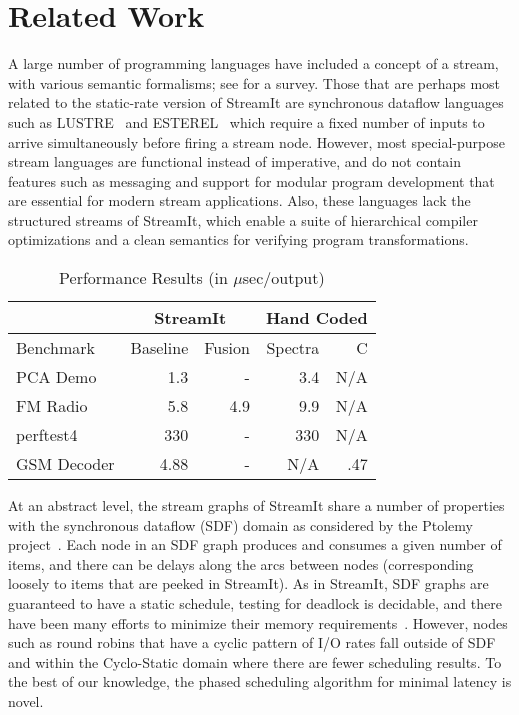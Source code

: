 \section{Related Work}
\label{sec:related}

A large number of programming languages have included a concept of a
stream, with various semantic formalisms; see \cite{survey97} for a
survey.  Those that are perhaps most related to the static-rate
version of StreamIt are synchronous dataflow languages such as
LUSTRE~\cite{lustre} and ESTEREL~\cite{esterel92} which require a
fixed number of inputs to arrive simultaneously before firing a stream
node.  However, most special-purpose stream languages are functional
instead of imperative, and do not contain features such as messaging
and support for modular program development that are essential for
modern stream applications.  Also, these languages lack the structured
streams of StreamIt, which enable a suite of hierarchical compiler
optimizations and a clean semantics for verifying program
transformations.

\begin{table}[t]
\begin{center}
\scriptsize
\begin{tabular}{|l|r|r|r|r|} \hline
& \multicolumn{2}{|c|}{StreamIt} &  \multicolumn{2}{|c|}{Hand Coded}\\
\hline 
Benchmark & Baseline & Fusion & Spectra & C \\
\hline \hline
PCA Demo & 1.3 & - & 3.4 & N/A\\
\hline
FM Radio & 5.8 & 4.9 & 9.9 & N/A\\
\hline
perftest4 & 330 & - & 330 & N/A\\
\hline
GSM Decoder & 4.88 & - & N/A & .47\\
\hline
\end{tabular}
\vspace{-6pt}
\caption{\protect\small Performance Results (in $\mu$sec/output)}
\label{tab:performance}
\vspace{-21pt}
\end{center}
\end{table}

At an abstract level, the stream graphs of StreamIt share a number of
properties with the synchronous dataflow (SDF) domain as considered by
the Ptolemy project~\cite{ptolemyoverview}.  Each node in an SDF graph
produces and consumes a given number of items, and there can be delays
along the arcs between nodes (corresponding loosely to items that are
peeked in StreamIt). As in StreamIt, SDF graphs are guaranteed to have
a static schedule, testing for deadlock is decidable, and there have
been many efforts to minimize their memory requirements~\cite{leesdf,
murt2001x1, gov94, goddardmanaging}.  However, nodes such as round
robins that have a cyclic pattern of I/O rates fall outside of SDF and
within the Cyclo-Static domain \cite{lauwereins94geometric} where
there are fewer scheduling results.  To the best of our knowledge, the
phased scheduling algorithm for minimal latency is novel.